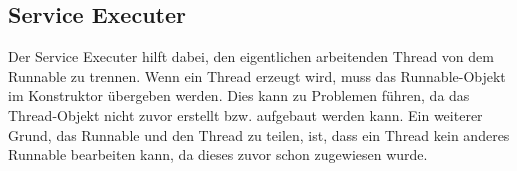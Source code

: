 \subsection{Service Executer}
Der Service Executer hilft dabei, den eigentlichen arbeitenden Thread von dem Runnable zu trennen. Wenn ein Thread erzeugt wird, muss das Runnable-Objekt im Konstruktor übergeben werden. Dies kann zu Problemen führen, da das Thread-Objekt nicht zuvor erstellt bzw. aufgebaut werden kann. Ein weiterer Grund, das Runnable und den Thread zu teilen, ist, dass ein Thread kein anderes Runnable bearbeiten kann, da dieses zuvor schon zugewiesen wurde.
\cite{javaInselBuch}
 
 
 
